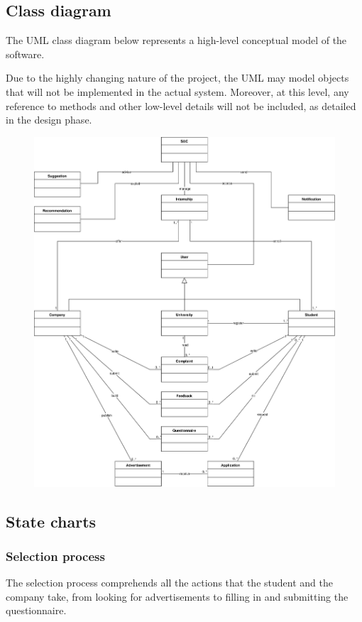 \subsection{Class diagram}

The UML class diagram below represents a high-level conceptual model of the software.

Due to the highly changing nature of the project, the UML may model objects that will not be implemented in the actual system.
Moreover, at this level, any reference to methods and other low-level details will not be included, as detailed in the design phase.

\begin{figure}[H]
    \centering
    \includegraphics[width=0.8\linewidth]{../../assets/class-diagrams/SC-UML.png}
\end{figure}

\subsection{State charts}

\subsubsection{Selection process}

The selection process comprehends all the actions that the student and the company take, from looking for advertisements to filling in and submitting the questionnaire.

